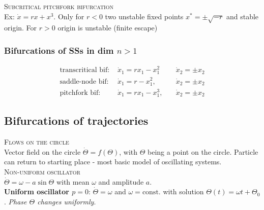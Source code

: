 \textsc{Subcritical pitchfork bifurcation}\\
Ex: $\dot{x}=rx+x^3$. Only for $r<0$ two unstable fixed points $x^*=\pm \sqrt{-r}$ and stable origin. For $r>0$ origin is unstable (finite escape)
\begin{center}
\end{center}

\subsubsection{Bifurcations of SSs in dim $n>1$}
\begin{align*}
\text{transcritical bif: }& \dot{x}_1=rx_1-x_1^2 \quad &\dot{x}_2 = \pm x_2 \\
\text{saddle-node bif: }& \dot{x}_1 = r-x_1^2, \quad &\dot{x}_2 = \pm x_2\\
\text{pitchfork bif: }& \dot{x}_1=rx_1-x_1^3, \quad &\dot{x}_2 = \pm x_2
\end{align*}

\subsection{Bifurcations of trajectories}
\textsc{Flows on the circle}\\
Vector field on the circle $\dot{\Theta}=f(\Theta)$, with $\Theta$ being a point on the circle. Particle can return to starting place - most basic model of oscillating systems.\\

\textsc{Non-uniform oscillator}\\
$\dot{\Theta} = \omega - a\sin \Theta$ with mean $\omega$ and amplitude $a$.\\
\textbf{Uniform oscillator $p=0$}: $\dot{\Theta} = \omega$ and $\omega=\text{const.}$ with solution $\Theta(t)=\omega t + \Theta_0$. \emph{Phase $\Theta$ changes uniformly}.\\

